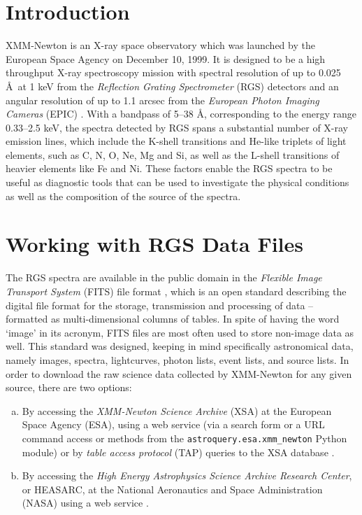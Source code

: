     \section{Introduction} \label{tool:intro}
    	XMM-Newton is an X-ray space observatory which was launched by the European Space Agency on December 10, 1999. It is designed to be a high throughput X-ray spectroscopy mission with spectral resolution of up to 0.025 \AA\ at 1 keV from the \textit{Reflection Grating Spectrometer} (RGS) detectors and an angular resolution of up to 1.1 arcsec from the \textit{European Photon Imaging Cameras} (EPIC) \cite{ehle2003xmm,jansen2001xmm}. With a bandpass of 5--38 \AA, corresponding to the energy range 0.33--2.5 keV, the spectra detected by RGS spans a substantial number of X-ray emission lines, which include the K-shell transitions and He-like triplets of light elements, such as C, N, O, Ne, Mg and Si, as well as the L-shell transitions of heavier elements like Fe and Ni. These factors enable the RGS spectra to be useful as diagnostic tools that can be used to investigate the physical conditions as well as the composition of the source of the spectra.
    
    \section{Working with RGS Data Files} \label{tool:rgs-files}
        The RGS spectra are available in the public domain in the \textit{Flexible Image Transport System} (FITS) file format \cite{chiappetti2018definition}, which is an open standard describing the digital file format for the storage, transmission and processing of data – formatted as multi-dimensional columns of tables. In spite of having the word `image' in its acronym, FITS files are most often used to store non-image data as well. This standard was designed, keeping in mind specifically astronomical data, namely images, spectra, lightcurves, photon lists, event lists, and source lists. In order to download the raw science data collected by XMM-Newton for any given source, there are two options:
        \begin{enumerate}[a)]
            \item By accessing the \textit{XMM-Newton Science Archive} (XSA) at the European Space Agency (ESA), using a web service (via a search form or a URL command access or methods from the \texttt{astroquery.esa.xmm\_newton} Python module) or by  \textit{table access protocol} (TAP) queries to the XSA database \cite{arviset2002xmm}.
            
            \item By accessing the \textit{High Energy Astrophysics Science Archive Research Center}, or HEASARC, at the National Aeronautics and Space Administration (NASA) using a web service \cite{barrett1993heasarc}.
        \end{enumerate}
        
